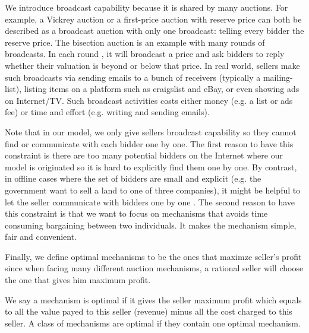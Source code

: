 We introduce broadcast capability because it is shared by many auctions.  For
example, a Vickrey auction or a first-price auction with reserve price can both be
described as a broadcast auction with only one broadcast: telling every bidder
the reserve price. The bisection auction \cite{Herings2009:BisectionAuction} is an
example with many rounds of broadcasts. In each round , it will broadcast
a price and ask bidders to reply whether their valuation is beyond or below that
price.  In real world, sellers make such broadcasts via sending emails to a
bunch of receivers (typically a mailing-list), listing items on a platform such
as craigslist and eBay, or even showing ads on Internet/TV. Such broadcast
activities costs either money (e.g. a list or ads fee) or time and effort (e.g.
writing and sending emails).

Note that in our model, we only give sellers broadcast capability so they
cannot find or communicate with each bidder one by one. The first reason to
have this constraint is there are too many potential bidders on the Internet
where our model is originated so it is hard to explicitly find
them one by one. By contrast, in offline cases where the set of bidders
are small and explicit (e.g. the government want to sell a land to one of three
companies), it might be helpful to let the seller communicate with bidders one
by one \cite{McAfee88:SearchMechanisms}. The second reason to have this constraint is
that we want to focus on mechanisms that avoids time consuming bargaining
between two individuals. It makes the mechanism simple, fair and convenient.

Finally, we define optimal mechanisms to be the ones that maximze seller's
profit since when facing many different auction mechanisms, a rational seller
will choose the one that gives him maximum profit.

\begin{definition}

We say a mechanism is optimal if it gives the seller maximum profit
which equals to all the value payed to this seller (revenue) minus all the cost charged
to this seller. A class of mechanisms are optimal if they contain one optimal
mechanism.

\end{definition}
